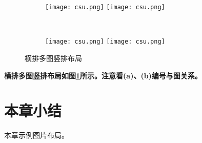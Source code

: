 \begin{figure}[!htb]
    \centering
    \begin{subfigure}[t]{0.3\linewidth}
        \captionsetup{justification=centering} 
        \begin{minipage}[b]{1\linewidth}
        \texttt{[image: csu.png]}
        \texttt{[image: csu.png]}
        \caption{}
        \end{minipage}
    \end{subfigure}\\
    \begin{subfigure}[t]{0.3\linewidth}
        \captionsetup{justification=centering} 
        \begin{minipage}[b]{1\linewidth}
        \texttt{[image: csu.png]}
        \texttt{[image: csu.png]}
        \caption{}
        \end{minipage}
    \end{subfigure}
    \caption{横排多图竖排布局}
    \label{F.csu_row_col}
\end{figure}

\textbf{横排多图竖排布局如图\ref{F.csu_row_col}所示。注意看(a)、(b)编号与图关系。}

\section{本章小结}
本章示例图片布局。

